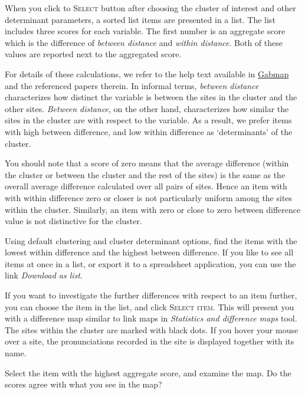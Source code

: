 \documentclass{article}
\newcommand{\gabmap}{\href{http://www.gabmap.nl/}{Gabmap}}
\begin{document}
When you click to \textsc{Select} button after choosing the cluster of
interest and other determinant parameters, a sorted list items are
presented in a list. The list includes three scores for each variable.
The first number is an aggregate score which is the difference of
\emph{between distance} and  \emph{within distance}.  Both of these
values are reported next to the aggregated score. 

For details of these calculations, we refer to the help text available
in \gabmap{} and the referenced papers therein. In informal terms,
\emph{between distance} characterizes how distinct the variable is
between the sites in the cluster and the other sites. \emph{Between
distance}, on the other hand, characterizes how similar the sites in
the cluster are with respect to the variable. As a result, we prefer
items with high between difference, and low within difference as
`determinants' of the cluster.

You should note that a score of zero means that the average difference
(within the cluster or between the cluster and the rest of the sites)
is the same as the overall average difference calculated over all
pairs of sites. Hence an item with with within difference zero or
closer is not particularly uniform among the sites within the cluster.
Similarly, an item with zero or close to zero between difference value
is not distinctive for the cluster.


\begin{Exercise}
Using default clustering and cluster determinant options, find the items 
with the lowest within difference and the highest between difference.  
If you like to see all items at once in a list, or export it to a 
spreadsheet application, you can use the link \emph{Download as list}.
\end{Exercise}

If you want to investigate the further differences with respect to an
item further, you can choose the item in the list, and click
\textsc{Select item}. This will present you with a difference map
similar to link maps in \emph{Statistics and difference maps} tool.
The sites within the cluster are marked with black dots. If you hover
your mouse over a site, the pronunciations recorded in the site is
displayed together with its name.

\begin{Exercise}
Select the item with the highest aggregate score, and examine the map.
Do the scores agree with what you see in the map?
\end{Exercise}
\end{document}
